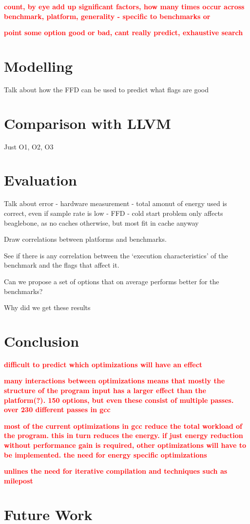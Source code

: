 \documentclass[twocolumn]{article}
\newcommand{\todo}[1]{\textbf{\textcolor{red}{#1}}}
\begin{document}
\todo{count, by eye add up significant factors, how many times occur across benchmark, platform, generality - specific to benchmarks or}

\todo{point some option good or bad, cant really predict, exhaustive search}

\section*{Modelling}

Talk about how the FFD can be used to predict what flags are good

\section*{Comparison with LLVM}

Just O1, O2, O3


\section*{Evaluation}

Talk about error
 - hardware measurement
 - total amonut of energy used is correct, even if sample rate is low
 - FFD
 - cold start problem
 	only affects beaglebone, as no caches otherwise, but most fit in cache anyway


Draw correlations between platforms and benchmarks.

See if there is any correlation between the `execution characteristics' of the benchmark and the flags that affect it.

Can we propose a set of options that on average performs better for the benchmarks?

Why did we get these results


\section*{Conclusion}

\todo{difficult to predict which optimizations will have an effect}

\todo{many interactions between optimizations means that mostly the structure of the program input has a larger effect than the platform(?). 150 options, but even these consist of multiple passes. over 230 different passes in gcc}

\todo{most of the current optimizations in gcc reduce the total workload of the program. this in turn reduces the energy. if just energy reduction without performance gain is required, other optimizations will have to be implemented. the need for energy specific optimizations}

\todo{unlines the need for iterative compilation and techniques such as milepost}

\section*{Future Work}

\printbibliography
\end{document}
